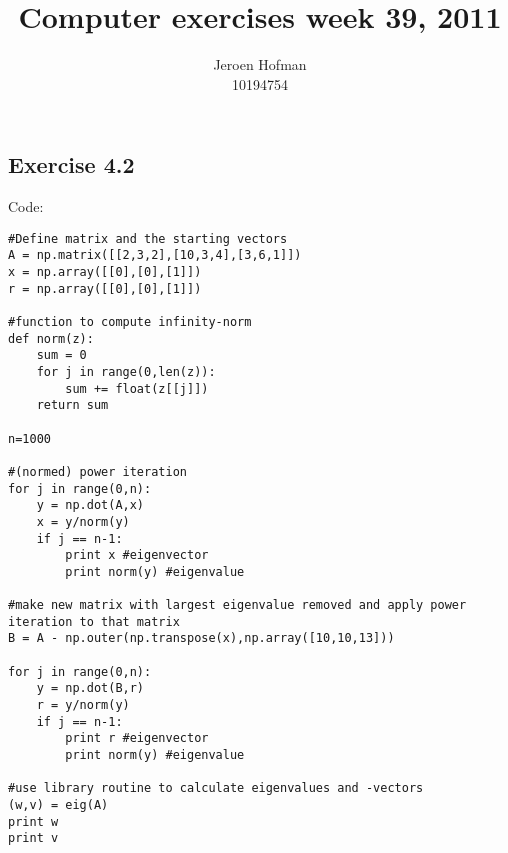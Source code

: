 \documentclass[10pt,a4paper]{article}
\begin{document}

\author{Jeroen Hofman\\
		10194754\\
		}
\title{Computer exercises week 39, 2011\\
		}
\date{}
\maketitle

\subsection*{Exercise 4.2}
Code:
\begin{lstlisting}
#Define matrix and the starting vectors
A = np.matrix([[2,3,2],[10,3,4],[3,6,1]])
x = np.array([[0],[0],[1]])
r = np.array([[0],[0],[1]]) 

#function to compute infinity-norm
def norm(z):
    sum = 0
    for j in range(0,len(z)):
        sum += float(z[[j]])
    return sum

n=1000

#(normed) power iteration
for j in range(0,n):
    y = np.dot(A,x)
    x = y/norm(y)
    if j == n-1:
        print x #eigenvector
        print norm(y) #eigenvalue

#make new matrix with largest eigenvalue removed and apply power iteration to that matrix
B = A - np.outer(np.transpose(x),np.array([10,10,13]))

for j in range(0,n):
    y = np.dot(B,r)
    r = y/norm(y)
    if j == n-1:
        print r #eigenvector
        print norm(y) #eigenvalue

#use library routine to calculate eigenvalues and -vectors
(w,v) = eig(A)
print w
print v
\end{lstlisting}
\end{document}
